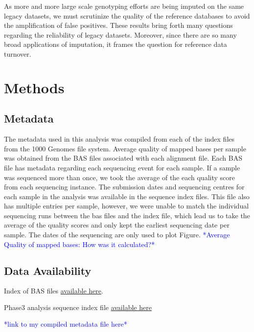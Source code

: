 \documentclass[9pt,lineno]{elife}
\newcommand{\todo}[1]{\textcolor{blue}{*#1*}}
\begin{document}
As more and more large scale genotyping efforts are being imputed on the same legacy datasets, we must scrutinize the quality of the reference databases to avoid the amplification of false positives. 
These results bring forth many questions regarding the reliability of legacy datasets. 
Moreover, since there are so many broad applications of imputation, it frames the question for reference data turnover. 



\section{Methods}
\subsection{Metadata}
The metadata used in this analysis was compiled from each of the index files from the 1000 Genomes file system. 
Average quality of mapped bases per sample was obtained from the BAS files associated with each alignment file. 
Each BAS file has metadata regarding each sequencing event for each sample. 
If a sample was sequenced more than once, we took the average of the each quality score from each sequencing instance. 
The submission dates and sequencing centres for each sample in the analysis was available in the sequence index files.  
This file also has multiple entries per sample, however, we were unable to match the individual sequencing runs between the bas files and the index file, which lead us to take the average of the quality scores and only kept the earliest sequencing date per sample. 
The dates of the sequencing are only used to plot Figure. \todo{Average Quality of mapped bases: How was it calculated?}

\subsection{Data Availability}

Index of BAS files \href{http://ftp.1000genomes.ebi.ac.uk/vol1/ftp/data_collections/1000_genomes_project/1000genomes.low_coverage.GRCh38DH.alignment.index}{available here}.

Phase3 analysis sequence index file  \href{http://ftp.1000genomes.ebi.ac.uk/vol1/ftp/phase3/20130502.phase3.analysis.sequence.index}{available here} 

\todo{link to my compiled metadata file here}
\end{document}
